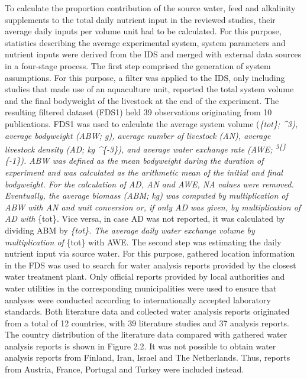\documentclass[preprint, 3p,
authoryear]{elsarticle} %
\begin{document}
To calculate the proportion contribution of the source water, feed and
alkalinity supplements to the total daily nutrient input in the reviewed
studies, their average daily inputs per volume unit had to be
calculated. For this purpose, statistics describing the average
experimental system, system parameters and nutrient inputs were derived
from the IDS and merged with external data sources in a four-stage
process. The first step comprised the generation of system assumptions.
For this purpose, a filter was applied to the IDS, only including
studies that made use of an aquaculture unit, reported the total system
volume and the final bodyweight of the livestock at the end of the
experiment. The resulting filtered dataset (FDS1) held 39 observations
originating from 10 publications. FDS1 was used to calculate the average
system volume (\emph{\{tot\}; \^{}3), average
bodyweight (ABW; g), average number of livestock (AN), average livestock
density (AD; kg \^{}\{-3\}), and average water exchange rate
(AWE; \textsuperscript{3\{\}}\{-1\}). ABW was
defined as the mean bodyweight during the duration of experiment and was
calculated as the arithmetic mean of the initial and final bodyweight.
For the calculation of AD, AN and AWE, NA values were removed.
Eventually, the average biomass (ABM; kg) was computed by multiplication
of ABW with AN and unit conversion or, if only AD was given, by
multiplication of AD with }\{tot\}. Vice versa, in case AD was
not reported, it was calculated by dividing ABM by
\emph{\{tot\}. The average daily water exchange volume by
multiplication of }\{tot\} with AWE. The second step was
estimating the daily nutrient input via source water. For this purpose,
gathered location information in the FDS was used to search for water
analysis reports provided by the closest water treatment plant. Only
official reports provided by local authorities and water utilities in
the corresponding municipalities were used to ensure that analyses were
conducted according to internationally accepted laboratory standards.
Both literature data and collected water analysis reports originated
from a total of 12 countries, with 39 literature studies and 37 analysis
reports. The country distribution of the literature data compared with
gathered water analysis reports is shown in Figure 2.2. It was not
possible to obtain water analysis reports from Finland, Iran, Israel and
The Netherlands. Thus, reports from Austria, France, Portugal and Turkey
were included instead.
\end{document}

